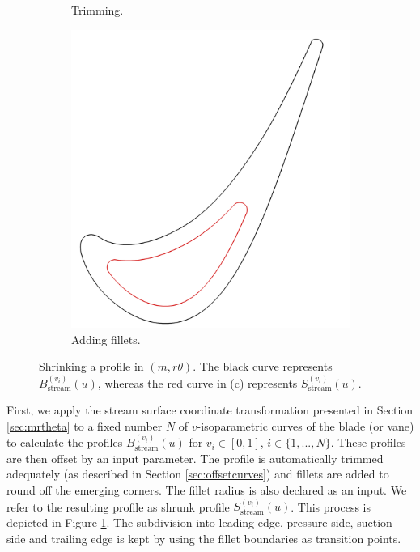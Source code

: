 \documentclass[a4paper, 11pt]{report}
\theoremstyle{definition}
\begin{document}
\begin{figure}[H]
\begin{subfigure}{.32\textwidth}
			\caption{Trimming.}
		\end{subfigure}
		\begin{subfigure}{.32\textwidth}
			\includegraphics[width=\textwidth]{../tec/shrinking/13.png}
			\caption{Adding fillets.}
		\end{subfigure}
		\caption{Shrinking a profile in $(m, r\theta)$. The black curve represents $B^{(v_i)}_\textrm{stream}(u)$, whereas the red curve in (c) represents $S^{(v_i)}_\textrm{stream}(u)$.}
		\label{fig:profileshrinking}
	\end{figure}

	First, we apply the stream surface coordinate transformation presented in Section \ref{sec:mrtheta} to a fixed number $N$ of $v$-isoparametric curves of the blade (or vane) to calculate the profiles $B^{(v_i)}_\textrm{stream}(u)$ for $v_i \in [0,1]$, $i \in \{1,...,N\}$. These profiles are then offset by an input parameter. The profile is automatically trimmed adequately (as described in Section \ref{sec:offsetcurves}) and fillets are added to round off the emerging corners. The fillet radius is also declared as an input. We refer to the resulting profile as shrunk profile $S^{(v_i)}_\textrm{stream}(u)$. This process is depicted in Figure \ref{fig:profileshrinking}. The subdivision into leading edge, pressure side, suction side and trailing edge is kept by using the fillet boundaries as transition points.
\end{document}
